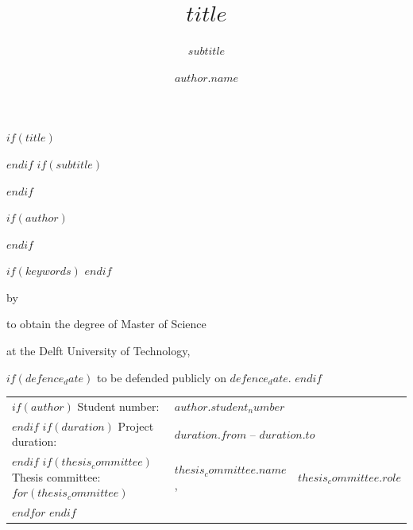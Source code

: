 \documentclass[dvipsnames,whitelogo]{tudelft-report}
\begin{document}
\frontmatter

$if(title)$
\title[tudelft-white]{$title$}
$endif$
$if(subtitle)$
\subtitle[tudelft-black]{$subtitle$}
$endif$

$if(author)$
\author[tudelft-white]{$author.name$}
$endif$

$if(keywords)$
$endif$
\makecover[split]


\begin{titlepage}

\begin{center}


{\makeatletter
\largetitlestyle\fontsize{64}{94}\selectfont\@title
\makeatother}

{\makeatletter
\ifx\@subtitle\undefined\else
    \bigskip
   {\tudsffamily\fontsize{22}{32}\selectfont\@subtitle}
\fi
\makeatother}

\bigskip
\bigskip

by

\bigskip
\bigskip

{\makeatletter
\largetitlestyle\fontsize{26}{26}\selectfont\@author
\makeatother}

\bigskip
\bigskip

to obtain the degree of Master of Science

at the Delft University of Technology,

$if(defence_date)$
to be defended publicly on $defence_date$.
$endif$

\vfill

\begin{tabular}{lll}

	$if(author)$
    Student number: & $author.student_number$ \\
    $endif$
	$if(duration)$
    Project duration: & \multicolumn{2}{l}{$duration.from$ -- $duration.to$} \\
    $endif$
	$if(thesis_committee)$
    Thesis committee:
		$for(thesis_committee)$
    	& $thesis_committee.name$, & $thesis_committee.role$ \\
    	$endfor$
    $endif$
\end{tabular}


\end{center}
\end{titlepage}
\end{document}
